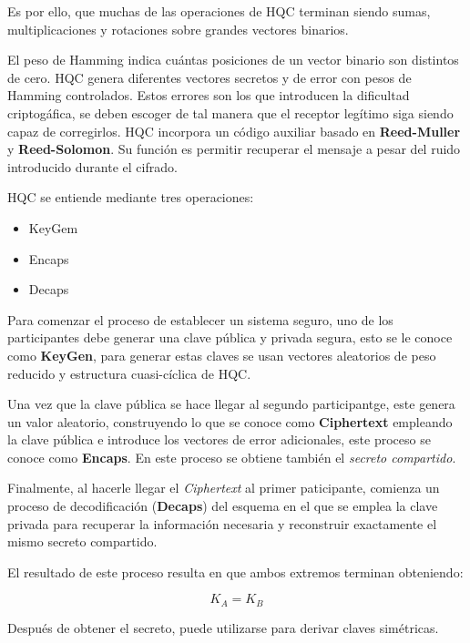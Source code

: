     Es por ello, que muchas de las operaciones de HQC terminan siendo sumas, multiplicaciones y rotaciones sobre grandes vectores binarios. 

    El peso de Hamming indica cuántas posiciones de un vector binario son distintos de cero. HQC genera diferentes vectores secretos y de error con pesos de Hamming controlados. 
    Estos errores son los que introducen la dificultad criptogáfica, se deben escoger de tal manera que el receptor legítimo siga siendo capaz de corregirlos. HQC incorpora un código auxiliar basado en \textbf{Reed-Muller} y \textbf{Reed-Solomon}. Su función es permitir recuperar el mensaje a pesar del ruido introducido durante el cifrado. 

    HQC se entiende mediante tres operaciones:

    \begin{itemize}
        \item KeyGem
        \item Encaps
        \item Decaps
    \end{itemize}

    Para comenzar el proceso de establecer un sistema seguro, uno de los participantes debe generar una clave pública y privada segura, esto se le conoce como \textbf{KeyGen},
    para generar estas claves se usan vectores aleatorios de peso reducido y estructura cuasi-cíclica de HQC.

    Una vez que la clave pública se hace llegar al segundo participantge, este genera un valor aleatorio, construyendo lo que se conoce como \textbf{Ciphertext} empleando la clave pública e introduce los vectores
    de error adicionales, este proceso se conoce como \textbf{Encaps}. En este proceso se obtiene también el \textit{secreto compartido}.

    Finalmente, al hacerle llegar el \textit{Ciphertext} al primer paticipante, comienza un proceso de decodificación (\textbf{Decaps}) del esquema en el que se emplea la clave privada para recuperar la información necesaria y reconstruir exactamente
    el mismo secreto compartido.

    El resultado de este proceso resulta en que ambos extremos terminan obteniendo:

    \begin{equation}
        K_A = K_B
    \end{equation}

    Después de obtener el secreto, puede utilizarse para derivar claves simétricas. 

